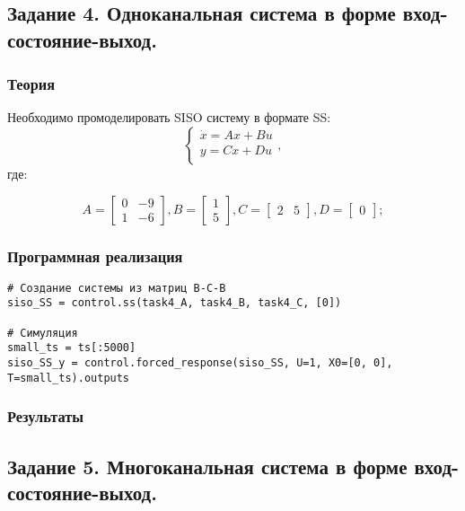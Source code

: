 \documentclass[16pt]{article}
\begin{document}
\newpage
\subsection{Задание 4. Одноканальная система в форме вход-состояние-выход.}
\subsubsection{Теория}
Необходимо промоделировать SISO систему в формате SS:
\[ 
    \begin{cases}
        \dot{x} = Ax + Bu \\
        y = Cx + Du \\
    \end{cases},
\]
где:

\[ 
    A = \begin{bmatrix}
        0 &  -9 \\
        1 &  -6 
        \end{bmatrix},
        B = \begin{bmatrix}
            1 \\
            5
            \end{bmatrix},
        C = \begin{bmatrix}
            2 & 5
            \end{bmatrix},
        D = \begin{bmatrix}
            0
            \end{bmatrix};
\]

\subsubsection{Программная реализация}
\begin{verbatim}
# Создание системы из матриц В-С-В
siso_SS = control.ss(task4_A, task4_B, task4_C, [0])

# Симуляция
small_ts = ts[:5000]
siso_SS_y = control.forced_response(siso_SS, U=1, X0=[0, 0], T=small_ts).outputs
\end{verbatim}

\subsubsection{Результаты}


\newpage
\subsection{Задание 5. Многоканальная система в форме вход-состояние-выход.}
\end{document}
